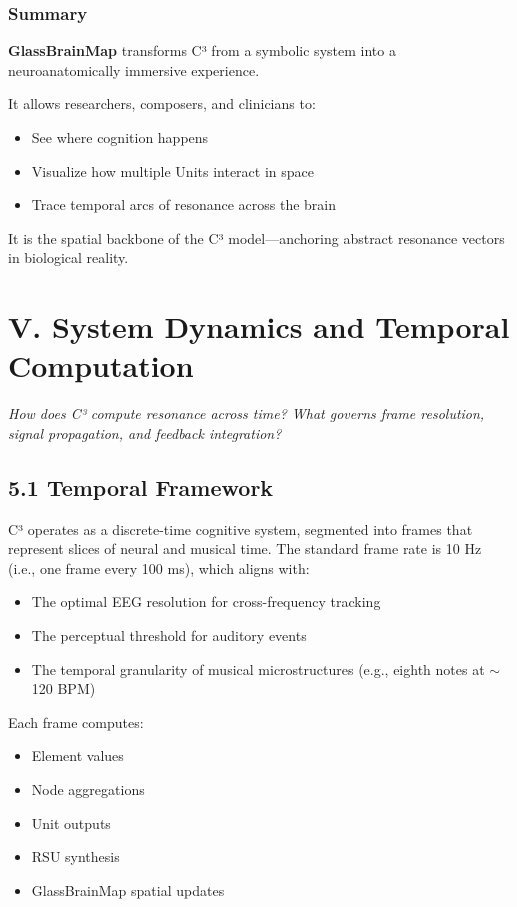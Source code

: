 \documentclass[10pt]{article}
\begin{document}
\subsubsection*{Summary}

\textbf{GlassBrainMap} transforms C³ from a symbolic system into a neuroanatomically immersive experience.

It allows researchers, composers, and clinicians to:

\begin{itemize}
    \item See where cognition happens
    \item Visualize how multiple Units interact in space
    \item Trace temporal arcs of resonance across the brain
\end{itemize}

It is the spatial backbone of the C³ model—anchoring abstract resonance vectors in biological reality.

\section*{V. System Dynamics and Temporal Computation}

\textit{How does C³ compute resonance across time? What governs frame resolution, signal propagation, and feedback integration?}

\subsection*{5.1 Temporal Framework}

C³ operates as a discrete-time cognitive system, segmented into frames that represent slices of neural and musical time. The standard frame rate is 10 Hz (i.e., one frame every 100 ms), which aligns with:

\begin{itemize}
    \item The optimal EEG resolution for cross-frequency tracking
    \item The perceptual threshold for auditory events
    \item The temporal granularity of musical microstructures (e.g., eighth notes at $\sim$120 BPM)
\end{itemize}

Each frame computes:

\begin{itemize}
    \item Element values
    \item Node aggregations
    \item Unit outputs
    \item RSU synthesis
    \item GlassBrainMap spatial updates
\end{itemize}
\end{document}
